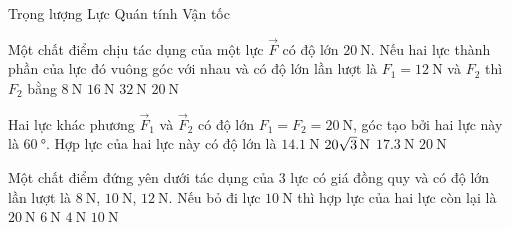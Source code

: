 \begin{ex}
	\choice
	{Trọng lượng}
	{Lực}
	{\True Quán tính}
	{Vận tốc}
	\loigiai{}
\end{ex}
\begin{ex}
Một chất điểm chịu tác dụng của một lực $\vec{F}$ có độ lớn $\SI{20}{\newton}$. Nếu hai lực thành phần của lực đó vuông góc với nhau	và có độ lớn lần lượt là $F_1=\SI{12}{\newton}$ và $F_2$ thì $F_2$ bằng
	\choice
	{\True $\SI{8}{\newton}$}
	{$\SI{16}{\newton}$}
	{$\SI{32}{\newton}$}
	{$\SI{20}{\newton}$}
	\loigiai{}
\end{ex}
\begin{ex}
Hai lực khác phương $\vec{F}_1$ và $\vec{F}_2$ có độ lớn $F_1=F_2=\SI{20}{\newton}$, góc tạo bởi hai lực này là $\SI{60}{\degree}$. Hợp lực của hai lực này có độ lớn là	
	\choice
	{$\SI{14.1}{\newton}$}
	{\True $\xsi{20\sqrt{3}}{\newton}$}
	{$\SI{17.3}{\newton}$}
	{$\SI{20}{\newton}$}
	\loigiai{}
\end{ex}
\begin{ex}
	Một chất điểm đứng yên dưới tác dụng của 3 lực có giá đồng quy và có độ lớn lần lượt là $\SI{8}{\newton}$, $\SI{10}{\newton}$, $\SI{12}{\newton}$. Nếu bỏ đi lực $\SI{10}{\newton}$ thì hợp lực của hai lực còn lại là
	\choice
	{$\SI{20}{\newton}$}
	{$\SI{6}{\newton}$}
	{$\SI{4}{\newton}$}
	{\True $\SI{10}{\newton}$}
	\loigiai{}
\end{ex}

